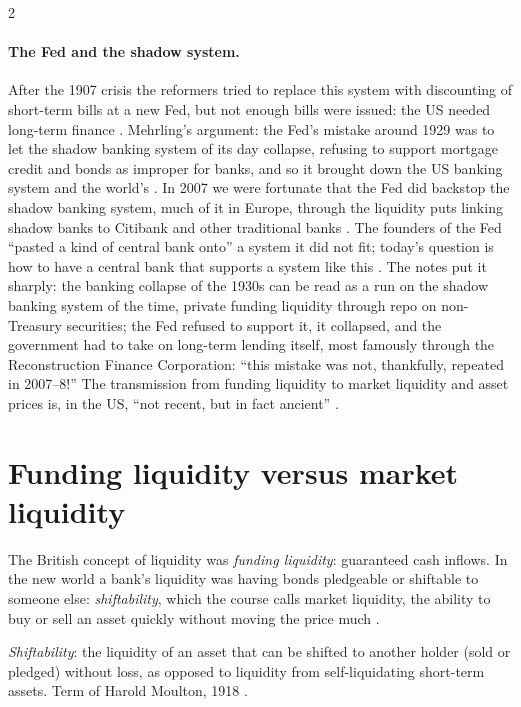 \begin{paracol}{2}
\paragraph{The Fed and the shadow system.} After the 1907 crisis the reformers tried to replace this system with discounting of short-term bills at a new Fed, but
not enough bills were issued: the US needed long-term finance . Mehrling's argument: the Fed's mistake around 1929
was to let the shadow banking system of its day collapse, refusing to support mortgage credit and bonds as improper for banks, and so it brought down the US
banking system and the world's . In 2007 we were fortunate that the Fed did backstop the shadow banking system,
much of it in Europe, through the liquidity puts linking shadow banks to Citibank and other traditional banks . The
founders of the Fed ``pasted a kind of central bank onto'' a system it did not fit; today's question is how to have a central bank that supports a system like
this . The notes put it sharply: the banking collapse of the 1930s can be read as a run on the shadow banking system of the time, private funding liquidity through repo on
non-Treasury securities; the Fed refused to support it, it collapsed, and the government had to take on long-term lending itself, most famously through the Reconstruction Finance Corporation:
``this mistake was not, thankfully, repeated in 2007--8!'' The transmission from funding liquidity to market liquidity and asset prices is, in the US, ``not recent, but in fact ancient''
.

\section{Funding liquidity versus market liquidity}\label{sec:di-shiftability}

The British concept of liquidity was \emph{funding liquidity}: guaranteed cash inflows. In the new world a bank's liquidity was having bonds pledgeable or
shiftable to someone else: \emph{shiftability}, which the course calls market liquidity, the ability to buy or sell an asset quickly without moving the price much
.

\begin{definition}
\emph{Shiftability}: the liquidity of an asset that can be shifted to another holder (sold or pledged) without loss, as opposed to liquidity from self-liquidating
short-term assets. Term of Harold Moulton, 1918 .
\end{definition}


\end{paracol}
